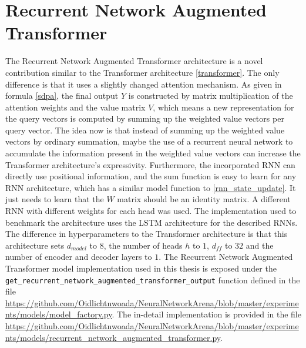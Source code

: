 \documentclass[draft,final]{vutinfth} %
\begin{document}
\section{Recurrent Network Augmented Transformer} \label{rnaut}
The Recurrent Network Augmented Transformer architecture is a novel contribution similar to the Transformer architecture \ref{transformer}.
The only difference is that it uses a slightly changed attention mechanism.
As given in formula \ref{sdpa}, the final output $Y$ is constructed by matrix multiplication of the attention weights and the value matrix $V$, which means a new representation for the query vectors is computed by summing up the weighted value vectors per query vector.
The idea now is that instead of summing up the weighted value vectors by ordinary summation, maybe the use of a recurrent neural network to accumulate the information present in the weighted value vectors can increase the Transformer architecture's expressivity.
Furthermore, the incorporated RNN can directly use positional information, and the sum function is easy to learn for any RNN architecture, which has a similar model function to \ref{rnn_state_update}.
It just needs to learn that the $W$ matrix should be an identity matrix.
A different RNN with different weights for each head was used.
The implementation used to benchmark the architecture uses the LSTM architecture for the described RNNs.
The difference in hyperparameters to the Transformer architecture is that this architecture sets $d_{model}$ to $8$, the number of heads $h$ to $1$, $d_{ff}$ to $32$ and the number of encoder and decoder layers to $1$.
The Recurrent Network Augmented Transformer model implementation used in this thesis is exposed under the \texttt{get\_recurrent\_network\_augmented\_transformer\_output} function defined in the file \url{https://github.com/Oidlichtnwoada/NeuralNetworkArena/blob/master/experiments/models/model_factory.py}.
The in-detail implementation is provided in the file \url{https://github.com/Oidlichtnwoada/NeuralNetworkArena/blob/master/experiments/models/recurrent_network_augmented_transformer.py}.
\end{document}
